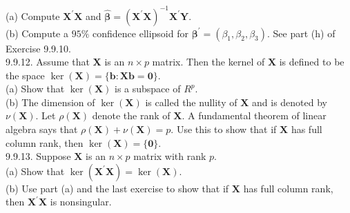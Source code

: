 (a) Compute $\boldsymbol{X}^{\prime} \boldsymbol{X}$ and $\hat{\boldsymbol{\beta}}=\left(\boldsymbol{X}^{\prime} \boldsymbol{X}\right)^{-1} \boldsymbol{X}^{\prime} \boldsymbol{Y}$.\\
(b) Compute a $95 \%$ confidence ellipsoid for $\boldsymbol{\beta}^{\prime}=\left(\beta_{1}, \beta_{2}, \beta_{3}\right)$. See part (h) of Exercise 9.9.10.\\
9.9.12. Assume that $\mathbf{X}$ is an $n \times p$ matrix. Then the kernel of $\mathbf{X}$ is defined to be the space $\operatorname{ker}(\mathbf{X})=\{\mathbf{b}: \mathbf{X b}=\mathbf{0}\}$.\\
(a) Show that $\operatorname{ker}(\mathbf{X})$ is a subspace of $R^{p}$.\\
(b) The dimension of $\operatorname{ker}(\mathbf{X})$ is called the nullity of $\mathbf{X}$ and is denoted by $\nu(\mathbf{X})$. Let $\rho(\mathbf{X})$ denote the rank of $\mathbf{X}$. A fundamental theorem of linear algebra says that $\rho(\mathbf{X})+\nu(\mathbf{X})=p$. Use this to show that if $\mathbf{X}$ has full column rank, then $\operatorname{ker}(\mathbf{X})=\{\mathbf{0}\}$.\\
9.9.13. Suppose $\mathbf{X}$ is an $n \times p$ matrix with rank $p$.\\
(a) Show that $\operatorname{ker}\left(\mathbf{X}^{\prime} \mathbf{X}\right)=\operatorname{ker}(\mathbf{X})$.\\
(b) Use part (a) and the last exercise to show that if $\mathbf{X}$ has full column rank, then $\mathbf{X}^{\prime} \mathbf{X}$ is nonsingular.

